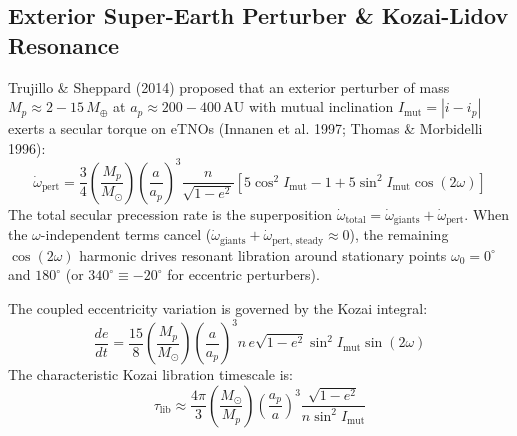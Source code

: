 \documentclass[11pt,a4paper]{article}
\begin{document}
\subsection{Exterior Super-Earth Perturber \& Kozai-Lidov Resonance}
Trujillo \& Sheppard (2014) proposed that an exterior perturber of mass $M_p \approx 2 - 15\,M_\oplus$ at $a_p \approx 200 - 400\,\text{AU}$ with mutual inclination $I_{\text{mut}} = |i - i_p|$ exerts a secular torque on eTNOs (Innanen et al. 1997; Thomas \& Morbidelli 1996):
\begin{equation}
\dot{\omega}_{\text{pert}} = \frac{3}{4} \left(\frac{M_p}{M_\odot}\right) \left(\frac{a}{a_p}\right)^3 \frac{n}{\sqrt{1 - e^2}} \left[ 5\cos^2 I_{\text{mut}} - 1 + 5\sin^2 I_{\text{mut}} \cos(2\omega) \right]
\label{eq:perturber_torque}
\end{equation}
The total secular precession rate is the superposition $\dot{\omega}_{\text{total}} = \dot{\omega}_{\text{giants}} + \dot{\omega}_{\text{pert}}$. When the $\omega$-independent terms cancel ($\dot{\omega}_{\text{giants}} + \dot{\omega}_{\text{pert, steady}} \approx 0$), the remaining $\cos(2\omega)$ harmonic drives resonant libration around stationary points $\omega_0 = 0^\circ$ and $180^\circ$ (or $340^\circ \equiv -20^\circ$ for eccentric perturbers).

The coupled eccentricity variation is governed by the Kozai integral:
\begin{equation}
\frac{de}{dt} = \frac{15}{8} \left(\frac{M_p}{M_\odot}\right) \left(\frac{a}{a_p}\right)^3 n\,e\sqrt{1 - e^2} \sin^2 I_{\text{mut}} \sin(2\omega)
\label{eq:de_dt}
\end{equation}
The characteristic Kozai libration timescale is:
\begin{equation}
\tau_{\text{lib}} \approx \frac{4\pi}{3} \left(\frac{M_\odot}{M_p}\right) \left(\frac{a_p}{a}\right)^3 \frac{\sqrt{1 - e^2}}{n \sin^2 I_{\text{mut}}}
\label{eq:tau_lib}
\end{equation}
\end{document}
